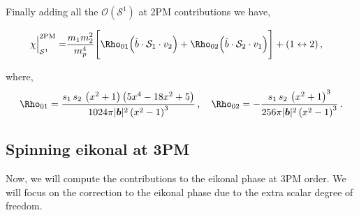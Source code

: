 Finally adding all the $\mathcal{O}(\mathcal{S}^1)$ at 2PM contributions we have,

\begin{tcolorbox}[thesisresultbox, title=\textit{Spinning Eikonal at 2PM}]
\restorethesisbodyformat
\begin{align*}   \chi\Big|_{\mathcal{S}^1}^{\textrm{2PM}}=&\frac{m_1m_2^2}{m_p^4}\Bigg[\Rho_{01}\Big(\hat b\cdot \mathcal{S}_{1}\cdot v_2\Big)+\Rho_{02}\Big(\hat b\cdot \mathcal{S}_2\cdot v_1 \Big)\Bigg]+(1\leftrightarrow 2)\,,
\end{align*}
\end{tcolorbox}
\restorethesisbodyformat
where, $$\Rho_{01}=\frac{s_1\,s_2\,\left(x^2+1\right) \left(5 x^4-18 x^2+5\right)}{1024 \pi  |\boldsymbol{b}|^2  \left(x^2-1\right)^3}\,,\quad \Rho_{02}=-\frac{s_1\,s_2\,\left(x^2+1\right)^3}{256 \pi  |\boldsymbol{b}|^2  \left(x^2-1\right)^3}\,.$$
\subsection*{Spinning eikonal at 3PM}
Now, we will compute the contributions to the eikonal phase at 3PM order. We will focus on the correction to the eikonal phase due to the extra scalar degree of freedom.


